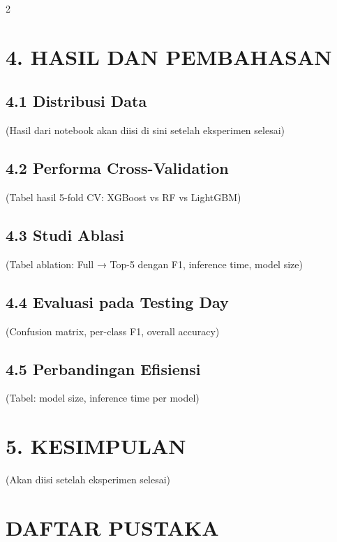 \documentclass[10pt,a4paper]{article}
\begin{document}
\begin{multicols}{2}
\section*{\textbf{4. HASIL DAN PEMBAHASAN}}

\subsection*{4.1 Distribusi Data}

(Hasil dari notebook akan diisi di sini setelah eksperimen selesai)

\subsection*{4.2 Performa Cross-Validation}

(Tabel hasil 5-fold CV: XGBoost vs RF vs LightGBM)

\subsection*{4.3 Studi Ablasi}

(Tabel ablation: Full → Top-5 dengan F1, inference time, model size)

\subsection*{4.4 Evaluasi pada Testing Day}

(Confusion matrix, per-class F1, overall accuracy)

\subsection*{4.5 Perbandingan Efisiensi}

(Tabel: model size, inference time per model)

\section*{\textbf{5. KESIMPULAN}}

(Akan diisi setelah eksperimen selesai)

\section*{\textbf{DAFTAR PUSTAKA}}


\end{multicols}
\end{document}
